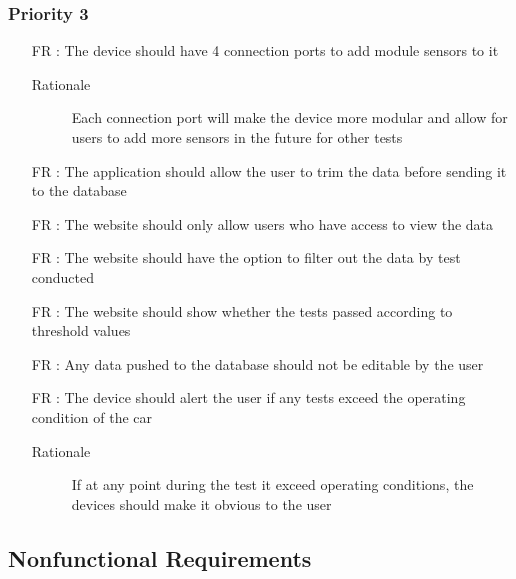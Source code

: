 \documentclass[12pt]{article}
\newcounter{reqnum} %
\begin{document}
\subsubsection{Priority 3}
\begin{itemize}
  \item[FR \refstepcounter{reqnum}\thereqnum:] The device should have 4 connection ports to add module sensors to it
  \begin{description} \item[Rationale] Each connection port will make the device more modular and allow for users to add more sensors in the future for other tests  \end{description}

  \item[FR \refstepcounter{reqnum}\thereqnum:] The application should allow the user to trim the data before sending it to the database

  \item[FR \refstepcounter{reqnum}\thereqnum:] The website should only allow users who have access to view the data
  
  \item[FR \refstepcounter{reqnum}\thereqnum:] The website should have the option to filter out the data by test conducted
  
  \item[FR \refstepcounter{reqnum}\thereqnum:] The website should show whether the tests passed according to threshold values
  
  \item[FR \refstepcounter{reqnum}\thereqnum:] Any data pushed to the database should not be editable by the user
  
  \item[FR \refstepcounter{reqnum}\thereqnum:] The device should alert the user if any tests exceed the operating condition of the car
  \begin{description} \item[Rationale] If at any point during the test it exceed operating conditions, the devices should make it obvious to the user  \end{description}
  
  \end{itemize}

\newpage
\subsection{Nonfunctional Requirements}
\end{document}

